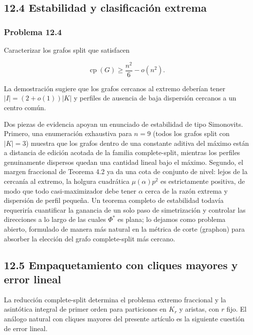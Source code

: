\documentclass[
  11pt,
]{article}
\begin{document}
\subsection{12.4 Estabilidad y clasificación extrema}\label{estabilidad-y-clasificaciuxf3n-extrema}

\subsubsection{Problema 12.4}\label{problema-12.4}

Caracterizar los grafos split que satisfacen

\[
\operatorname{cp}(G)
\ge
\frac{n^2}{6}-o(n^2).
\]

La demostración sugiere que los grafos cercanos al extremo deberían tener \(|I|=(2+o(1))|K|\) y perfiles de ausencia de baja dispersión cercanos a un centro común.

Dos piezas de evidencia apoyan un enunciado de estabilidad de tipo Simonovits. Primero, una enumeración exhaustiva para \(n=9\) (todos los grafos split con \(|K|=3\)) muestra que los grafos dentro de una constante aditiva del máximo están a distancia de edición acotada de la familia complete-split, mientras los perfiles genuinamente dispersos quedan una cantidad lineal bajo el máximo. Segundo, el margen fraccional de Teorema 4.2 ya da una cota de conjunto de nivel: lejos de la cercanía al extremo, la holgura cuadrática \(\mu(\alpha)p^2\) es estrictamente positiva, de modo que todo casi-maximizador debe tener \(\alpha\) cerca de la razón extrema y dispersión de perfil pequeña. Un teorema completo de estabilidad todavía requeriría cuantificar la ganancia de un solo paso de simetrización y controlar las direcciones a lo largo de las cuales \(\Phi^*\) es plana; lo dejamos como problema abierto, formulado de manera más natural en la métrica de corte (graphon) para absorber la elección del grafo complete-split más cercano.

\subsection{12.5 Empaquetamiento con cliques mayores y error lineal}\label{empaquetamiento-con-cliques-mayores-y-error-lineal}

La reducción complete-split determina el problema extremo fraccional y la asintótica integral de primer orden para particiones en \(K_r\) y aristas, con \(r\) fijo. El análogo natural con cliques mayores del presente artículo es la siguiente cuestión de error lineal.
\end{document}
